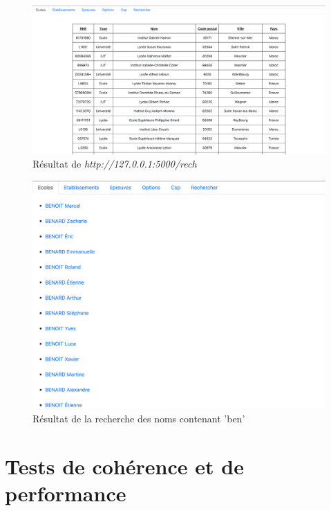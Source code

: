 \documentclass[12pt]{article}
\begin{document}
                \begin{figure}[!h]
        \centering
        \includegraphics[scale = 0.4]{Images/App/ecoles.png}
        \caption{Résultat de \textit{http://127.0.0.1:5000/rech}}
    \end{figure}
    
                   \begin{figure}[!h]
        \centering
        \includegraphics[scale = 0.4]{Images/App/rech.png}
        \caption{Résultat de la recherche des noms contenant 'ben'}
    \end{figure}

        
   

       
            

\newpage

\section{Tests de cohérence et de performance}
\end{document}
